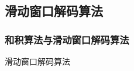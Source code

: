 \documentclass{beamer}
\begin{document}
\subsection{滑动窗口解码算法}
\begin{frame}[shrink]
    \frametitle{和积算法与滑动窗口解码算法}
        \begin{block}{滑动窗口解码算法}
        \begin{center}
\def\linkdoub{\draw [double distance=1mm, very thick] (0,0)--}
\def\linksing{\draw [very thick] (0,0)--}
\def\check{%
    \filldraw [fill=white,very thick] (0,0) circle (5pt);
    \draw [very thick] (0,3.5pt)--(0,-3.5pt);
    \draw [very thick] (3.5pt,0)--(-3.5pt,0);
}
\def\bit{%
    \filldraw [fill=white,very thick] (0,0) circle (5pt);
    \draw [very thick] (-3.2pt,2.2pt)--(3.2pt,2.2pt);
    \draw [very thick] (-3.2pt,-2.2pt)--(3.2pt,-2.2pt);
}
\def\thetaone{60}
\def\thetatwo{-60}
\def\armLength{0.9}
\def\symbolDist{1}


\end{center}
\end{block}
\end{frame}
\end{document}
